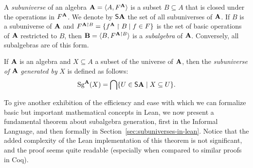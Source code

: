 \documentclass[11pt]{amsart}  %
\begin{document}

A \emph{subuniverse} of an algebra $\mathbf{A} = \langle A, F^{\mathbf{A}}\rangle$ is a subset $B \subseteq A$
that is closed under the operations in $F^{\mathbf{A}}$.  
We denote by $\mathsf{S} \mathbf{A}$ the set of all subuniverses of $\mathbf{A}$.
If $B$ is a subuniverse of $\mathbf{A}$ and 
$F^{\mathbf{A} \upharpoonright B} = \{f^{\mathbf{A}} \upharpoonright B \mid f \in F\}$ is the set of 
basic operations of $\mathbf{A}$ restricted to $B$, 
then $\mathbf{B} = \langle B, F^{\mathbf{A} \upharpoonright B}\rangle$ is a \emph{subalgebra} of $\mathbf{A}$.
Conversely, all subalgebras are of this form.

If $\mathbf{A}$ is an algebra and $X  \subseteq  A$ a subset of the 
universe of $\mathbf{A}$, then the \emph{subuniverse of} $\mathbf{A}$ 
\emph{generated by}  $X$ is defined as follows:
\begin{equation}
  \label{eq:SgDef}
\operatorname{Sg}^{\mathbf{A}}(X)  =  \bigcap \{U \in  \mathsf{S} \mathbf{A} \mid  X  \subseteq  U\}.
\end{equation}

To give another exhibition of the efficiency and ease with which we can formalize basic but important mathematical concepts in Lean, we now present a fundamental theorem about subalgebra generation, first in the Informal Language, and then formally in Section~\ref{sec:subuniverses-in-lean}.
Notice that the added complexity of the Lean implementation of this theorem is not significant, and the proof seems quite readable (especially when compared to similar proofs in Coq).  
\end{document}
